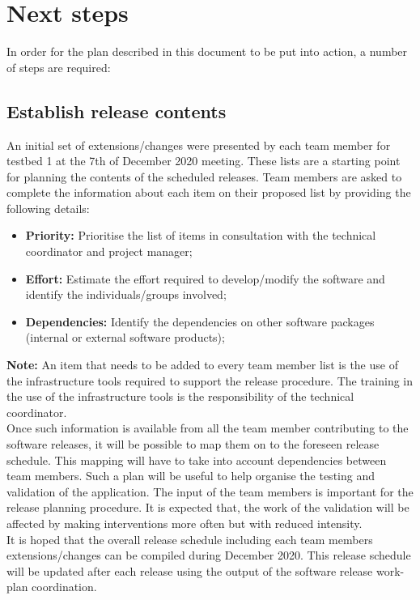 \section{Next steps}

\noindent In order for the plan described in this document to be put into action, a number of steps are required:

\subsection{Establish release contents}

\noindent An initial set of extensions/changes were presented by each team member for testbed 1 at the 7th of December 2020 meeting. These lists are a starting point for planning the contents of the scheduled releases. Team members are asked to complete the information about each item on their proposed list by providing the following details:
\begin{itemize}
\item \textbf{Priority:}
Prioritise the list of items in consultation with the technical coordinator and project manager;
\item \textbf{Effort:}
Estimate the effort required to develop/modify the software and identify the individuals/groups involved;
\item \textbf{Dependencies:}
Identify the dependencies on other software packages (internal or external software products);
\end{itemize}

\noindent \textbf{Note:} An item that needs to be added to every team member list is the use of the infrastructure tools required to support the release procedure. The training in the use of the infrastructure tools is the responsibility of the technical coordinator.\\

\noindent Once such information is available from all the team member contributing to the software releases, it will be possible to map them on to the foreseen release schedule. This mapping will have to take into account dependencies between team members. Such a plan will be useful to help organise the testing and validation of the application. The input of the team members is important for the release planning procedure. It is expected that, the work of the validation will be affected by making interventions more often but with reduced intensity.\\

\noindent It is hoped that the overall release schedule including each team members extensions/changes can be compiled during December 2020. This release schedule will be updated after each release using the output of the software release work-plan coordination.\\

